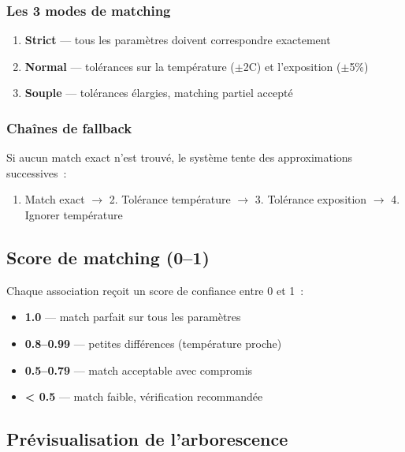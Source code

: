 \documentclass[a4paper,11pt]{article}
\begin{document}
\subsubsection{Les 3 modes de matching}

\begin{enumerate}
    \item \textbf{Strict} --- tous les param\`{e}tres doivent correspondre exactement
    \item \textbf{Normal} --- tol\'{e}rances sur la temp\'{e}rature ($\pm$2\textdegree{}C) et l'exposition ($\pm$5\%)
    \item \textbf{Souple} --- tol\'{e}rances \'{e}largies, matching partiel accept\'{e}
\end{enumerate}

\subsubsection{Cha\^{i}nes de fallback}

Si aucun match exact n'est trouv\'{e}, le syst\`{e}me tente des approximations successives~:

\begin{enumerate}
    \item Match exact $\rightarrow$ 2. Tol\'{e}rance temp\'{e}rature $\rightarrow$ 3. Tol\'{e}rance exposition $\rightarrow$ 4. Ignorer temp\'{e}rature
\end{enumerate}

\subsection{Score de matching (0--1)}

Chaque association re\c{c}oit un score de confiance entre 0 et 1~:

\begin{itemize}
    \item \textbf{1.0} --- match parfait sur tous les param\`{e}tres
    \item \textbf{0.8--0.99} --- petites diff\'{e}rences (temp\'{e}rature proche)
    \item \textbf{0.5--0.79} --- match acceptable avec compromis
    \item \textbf{< 0.5} --- match faible, v\'{e}rification recommand\'{e}e
\end{itemize}

\subsection{Pr\'{e}visualisation de l'arborescence}
\end{document}
